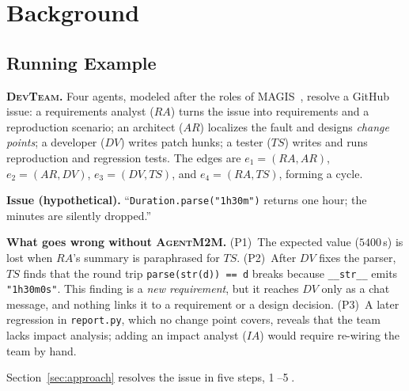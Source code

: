 \documentclass[10pt, anonymous, conference]{IEEEtran}
\theoremstyle{definition}
\theoremstyle{plain}
\theoremstyle{remark}
\newcommand{\tool}{\textsc{AgentM2M}}
\newcommand{\devteam}{\textsc{DevTeam}}
\newcommand{\code}[1]{\texttt{#1}}
\newcommand{\step}[1]{\textcircled{\scriptsize #1}}
\begin{document}



\section{Background} \label{sec:background} %

\subsection{Running Example} \label{subsec:example}

\begin{runbox}
\noindent\textbf{\devteam{}.} Four agents, modeled after the roles of
MAGIS~\cite{tao2024magis}, resolve a GitHub issue: a requirements analyst
($\mathit{RA}$) turns the issue into requirements and a reproduction scenario;
an architect ($\mathit{AR}$) localizes the fault and designs \emph{change
points}; a developer ($\mathit{DV}$) writes patch hunks; a tester
($\mathit{TS}$) writes and runs reproduction and regression tests. The edges
are $e_1{=}(\mathit{RA},\mathit{AR})$, $e_2{=}(\mathit{AR},\mathit{DV})$,
$e_3{=}(\mathit{DV},\mathit{TS})$, and $e_4{=}(\mathit{RA},\mathit{TS})$,
forming a cycle.

\smallskip\noindent\textbf{Issue (hypothetical).} ``\code{Duration.parse("1h30m")}
returns one hour; the minutes are silently dropped.''

\smallskip\noindent\textbf{What goes wrong without \tool{}.}
(P1)~The expected value ($5400$\,s) is lost when $\mathit{RA}$'s summary is
paraphrased for $\mathit{TS}$.
(P2)~After $\mathit{DV}$ fixes the parser, $\mathit{TS}$ finds that the
round trip \code{parse(str(d)) == d} breaks because \code{\_\_str\_\_} emits
\code{"1h30m0s"}. This finding is a \emph{new requirement}, but it reaches
$\mathit{DV}$ only as a chat message, and nothing links it to a requirement or
a design decision.
(P3)~A later regression in \code{report.py}, which no change point covers,
reveals that the team lacks impact analysis; adding an impact analyst
($\mathit{IA}$) would require re-wiring the team by hand.

\smallskip\noindent Section~\ref{sec:approach} resolves the issue in five
steps, \step{1}--\step{5}.
\end{runbox}
\end{document}
